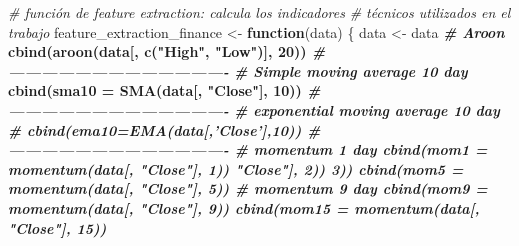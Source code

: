\documentclass[]{DissertateUSU}
\newenvironment{Shaded}{\begin{snugshade}}{\end{snugshade}}
\newcommand{\CommentTok}[1]{\textcolor[rgb]{0.56,0.35,0.01}{\textit{#1}}}
\newcommand{\ControlFlowTok}[1]{\textcolor[rgb]{0.13,0.29,0.53}{\textbf{#1}}}
\newcommand{\DataTypeTok}[1]{\textcolor[rgb]{0.13,0.29,0.53}{#1}}
\newcommand{\DecValTok}[1]{\textcolor[rgb]{0.00,0.00,0.81}{#1}}
\newcommand{\KeywordTok}[1]{\textcolor[rgb]{0.13,0.29,0.53}{\textbf{#1}}}
\newcommand{\NormalTok}[1]{#1}
\newcommand{\OperatorTok}[1]{\textcolor[rgb]{0.81,0.36,0.00}{\textbf{#1}}}
\newcommand{\StringTok}[1]{\textcolor[rgb]{0.31,0.60,0.02}{#1}}
\begin{document}
\begin{Shaded}
\begin{Highlighting}[]
\CommentTok{# función de feature extraction: calcula los indicadores}
\CommentTok{# técnicos utilizados en el trabajo}
\NormalTok{feature_extraction_finance <-}\StringTok{ }\ControlFlowTok{function}\NormalTok{(data) \{}
\NormalTok{    data <-}\StringTok{ }\NormalTok{data }\OperatorTok{%
\StringTok{    }\CommentTok{# Aroon}
\StringTok{    }\KeywordTok{cbind}\NormalTok{(}\KeywordTok{aroon}\NormalTok{(data[, }\KeywordTok{c}\NormalTok{(}\StringTok{"High"}\NormalTok{, }\StringTok{"Low"}\NormalTok{)], }\DecValTok{20}\NormalTok{)) }\OperatorTok{%
\StringTok{    }\CommentTok{#----------------------------------------}
\StringTok{    }
\StringTok{    }\CommentTok{# Simple moving average 10 day}
\StringTok{    }\KeywordTok{cbind}\NormalTok{(}\DataTypeTok{sma10 =} \KeywordTok{SMA}\NormalTok{(data[, }\StringTok{"Close"}\NormalTok{], }\DecValTok{10}\NormalTok{)) }\OperatorTok{%
\StringTok{    }\CommentTok{#----------------------------------------}
\StringTok{    }
\StringTok{    }\CommentTok{# exponential moving average 10 day}
\StringTok{    }\CommentTok{# cbind(ema10=EMA(data[,'Close'],10)) %
\StringTok{    }
\StringTok{    }\CommentTok{#----------------------------------------}
\StringTok{    }
\StringTok{    }\CommentTok{# momentum 1 day}
\StringTok{    }\KeywordTok{cbind}\NormalTok{(}\DataTypeTok{mom1 =} \KeywordTok{momentum}\NormalTok{(data[, }\StringTok{"Close"}\NormalTok{], }\DecValTok{1}\NormalTok{)) }\OperatorTok{%
        \StringTok{"Close"}\NormalTok{], }\DecValTok{2}\NormalTok{)) }\OperatorTok{%
        \DecValTok{3}\NormalTok{)) }\OperatorTok{%
\StringTok{        }\KeywordTok{cbind}\NormalTok{(}\DataTypeTok{mom5 =} \KeywordTok{momentum}\NormalTok{(data[, }\StringTok{"Close"}\NormalTok{], }\DecValTok{5}\NormalTok{)) }\OperatorTok{%
\StringTok{    }\CommentTok{# momentum 9 day}
\StringTok{    }\KeywordTok{cbind}\NormalTok{(}\DataTypeTok{mom9 =} \KeywordTok{momentum}\NormalTok{(data[, }\StringTok{"Close"}\NormalTok{], }\DecValTok{9}\NormalTok{)) }\OperatorTok{%
\StringTok{    }\KeywordTok{cbind}\NormalTok{(}\DataTypeTok{mom15 =} \KeywordTok{momentum}\NormalTok{(data[, }\StringTok{"Close"}\NormalTok{], }\DecValTok{15}\NormalTok{)) }\OperatorTok{%
}}}}}}}}}}
\end{Highlighting}
\end{Shaded}
\end{document}
